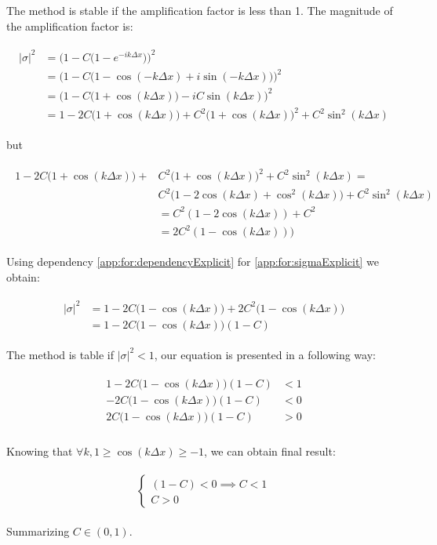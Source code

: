 	The method is stable if the amplification factor is less than 1. The magnitude of the amplification factor is:
	
	\begin{align}
		\begin{split}
			\label{app:for:sigmaExplicit}
			|\sigma|^2 &= \Bigg( 1 - C\Big(1 - e^{-ik\Delta x}\Big)\Bigg)^2 \\
			&= \Bigg( 1 - C\Big(1 -\cos(-k\Delta x) + i\sin(-k\Delta x)\Big)\Bigg)^2 \\
			&= \Bigg(1 - C\Big(1 +\cos(k\Delta x)\Big) - iC\sin(k\Delta x)\Bigg)^2 \\	
			&= 1 - 2C\Big(1 + \cos(k\Delta x)\Big) + C^2\Big(1 +\cos(k\Delta x)\Big)^2 + C^2\sin^2(k\Delta x)
		\end{split}
	\end{align} 
	
	but
	
	\begin{align}
		\begin{split}
			\label{app:for:dependencyExplicit}
			1 - 2C\Big(1 + \cos(k\Delta x)\Big) + &C^2\Big(1 +\cos(k\Delta x)\Big)^2 + C^2\sin^2(k\Delta x) = \\&C^2\Bigg(1 - 2\cos(k\Delta x) + \cos^2(k\Delta x)\Bigg) + C^2\sin^2(k\Delta x) \\
			&= C^2(1-2\cos(k\Delta x)) + C^2 \\
			&= 2C^2(1-\cos(k\Delta x)))
		\end{split}
	\end{align} 
	
	Using dependency \ref{app:for:dependencyExplicit} for \ref{app:for:sigmaExplicit} we obtain:
	
	\begin{align}
		\begin{split}
			|\sigma|^2 &= 1 - 2C\Big(1-\cos(k\Delta x)\Big) + 2C^2\Big(1 - \cos(k\Delta x)\Big) \\
			&= 1-2C\Big(1-\cos(k\Delta x)\Big)(1-C)
		\end{split}
	\end{align} 
	
	The method is table if $|\sigma|^2 < 1$, our equation is presented in a following way:
	
	\begin{align}
		\begin{split}
			1-2C\Big(1-\cos(k\Delta x)\Big)(1-C) &< 1 \\
			-2C\Big(1-\cos(k\Delta x)\Big)(1-C) &< 0 \\
			2C\Big(1-\cos(k\Delta x)\Big)(1-C) &>0 \\
		\end{split}
	\end{align} 
	
	Knowing that $ \forall k,  1 \geq \cos(k\Delta x) \geq -1$, we can obtain final result:
	
	\begin{align}
		\begin{split}
			\begin{cases}
				(1-C) <0 \implies C < 1 \\
				C > 0
			\end{cases}
		\end{split}
	\end{align} 
	
	Summarizing $C \in (0, 1)$.
	
	
	